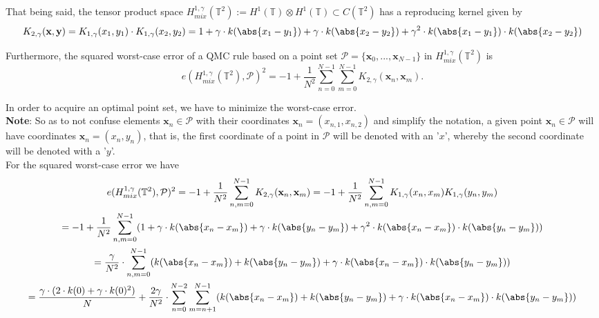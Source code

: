 That being said, the tensor product space $H_{mix}^{1,\gamma}(\mathbb{T}^2) := H^1(\mathbb{T})\otimes H^1(\mathbb{T}) \subset C(\mathbb{T}^2)$ has a reproducing kernel given by
\begin{equation*}
    K_{2,\gamma}(\textbf{x},\textbf{y}) = K_{1,\gamma}(x_1,y_1) \cdot K_{1,\gamma}(x_2,y_2) = 1 + \gamma \cdot k(\abs{x_1-y_1}) + \gamma \cdot k(\abs{x_2-y_2}) + \gamma^2 \cdot k(\abs{x_1-y_1})\cdot k(\abs{x_2-y_2})
\end{equation*}

\vspace{2mm}
Furthermore, the squared worst-case error of a QMC rule based on a point set $\mathcal{P}=\{\textbf{x}_0,...,\textbf{x}_{N-1}\}$ in $H_{mix}^{1,\gamma}(\mathbb{T}^2)$ is
\begin{equation*}
    e(H_{mix}^{1,\gamma}(\mathbb{T}^2),\mathcal{P})^2 = -1 + \frac{1}{N^2} \sum_{n=0}^{N-1} \sum_{m=0}^{N-1} K_{2,\gamma}(\textbf{x}_n,\textbf{x}_m).
\end{equation*}

\vspace{2mm}
In order to acquire an optimal point set, we have to minimize the worst-case error.\\

\textbf{Note}: So as to not confuse elements $\textbf{x}_n \in \mathcal{P}$ with their coordinates $\textbf{x}_n = (x_{n,1},x_{n,2})$ and simplify the notation, a given point $\textbf{x}_n \in \mathcal{P}$ will have coordinates $\textbf{x}_n = (x_n,y_n)$, that is, the first coordinate of a point in $\mathcal{P}$ will be denoted with an '$x$', whereby the second coordinate will be denoted with a '$y$'.\\

For the squared worst-case error we have
\begin{multline*}
    e(H_{mix}^{1,\gamma}(\mathbb{T}^2),\mathcal{P})^2 = -1 + \frac{1}{N^2} \sum_{n,m=0}^{N-1} K_{2,\gamma}(\textbf{x}_n,\textbf{x}_m) = -1 + \frac{1}{N^2} \sum_{n,m=0}^{N-1} K_{1,\gamma}(x_n,x_m) K_{1,\gamma}(y_n,y_m) \\ 
    = -1 + \frac{1}{N^2} \sum_{n,m=0}^{N-1} (1 + \gamma \cdot k(\abs{x_n-x_m}) + \gamma \cdot k(\abs{y_n-y_m}) + \gamma^2 \cdot k(\abs{x_n-x_m})\cdot k(\abs{y_n-y_m})) \\
    =\frac{\gamma}{N^2} \cdot \sum_{n,m=0}^{N-1} (k(\abs{x_n-x_m}) +  k(\abs{y_n-y_m}) + \gamma \cdot k(\abs{x_n-x_m})\cdot k(\abs{y_n-y_m})) \\
    = \frac{\gamma \cdot (2\cdot k(0)+ \gamma \cdot k(0)^2)}{N} + \frac{2\gamma}{N^2} \cdot \sum_{n=0}^{N-2} \sum_{m=n+1}^{N-1} (k(\abs{x_n-x_m}) +  k(\abs{y_n-y_m}) + \gamma \cdot k(\abs{x_n-x_m})\cdot k(\abs{y_n-y_m}))
\end{multline*}

